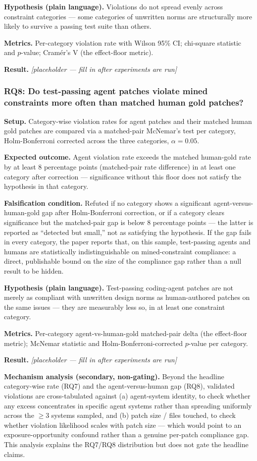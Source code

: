 \documentclass[11pt]{article}
\newcommand{\ph}{\textit{[placeholder --- fill in after experiments are run]}}
\begin{document}
\textbf{Hypothesis (plain language).} Violations do not spread evenly across constraint categories --- some categories of unwritten norms are structurally more likely to survive a passing test suite than others.

\textbf{Metrics.} Per-category violation rate with Wilson 95\% CI; chi-square statistic and $p$-value; Cram\'er's V (the effect-floor metric).

\textbf{Result.} \ph

\subsubsection{RQ8: Do test-passing agent patches violate mined constraints more often than matched human gold patches?}
\textbf{Setup.} Category-wise violation rates for agent patches and their matched human gold patches are compared via a matched-pair McNemar's test per category, Holm-Bonferroni corrected across the three categories, $\alpha = 0.05$.

\textbf{Expected outcome.} Agent violation rate exceeds the matched human-gold rate by at least 8 percentage points (matched-pair rate difference) in at least one category after correction --- significance without this floor does not satisfy the hypothesis in that category.

\textbf{Falsification condition.} Refuted if no category shows a significant agent-versus-human-gold gap after Holm-Bonferroni correction, or if a category clears significance but the matched-pair gap is below 8 percentage points --- the latter is reported as ``detected but small,'' not as satisfying the hypothesis. If the gap fails in every category, the paper reports that, on this sample, test-passing agents and humans are statistically indistinguishable on mined-constraint compliance: a direct, publishable bound on the size of the compliance gap rather than a null result to be hidden.

\textbf{Hypothesis (plain language).} Test-passing coding-agent patches are not merely as compliant with unwritten design norms as human-authored patches on the same issues --- they are measurably less so, in at least one constraint category.

\textbf{Metrics.} Per-category agent-vs-human-gold matched-pair delta (the effect-floor metric); McNemar statistic and Holm-Bonferroni-corrected $p$-value per category.

\textbf{Result.} \ph

\vspace{0.5em}
\noindent\textbf{Mechanism analysis (secondary, non-gating).} Beyond the headline category-wise rate (RQ7) and the agent-versus-human gap (RQ8), validated violations are cross-tabulated against (a) agent-system identity, to check whether any excess concentrates in specific agent systems rather than spreading uniformly across the $\geq$3 systems sampled, and (b) patch size / files touched, to check whether violation likelihood scales with patch size --- which would point to an exposure-opportunity confound rather than a genuine per-patch compliance gap. This analysis explains the RQ7/RQ8 distribution but does not gate the headline claims.
\end{document}
